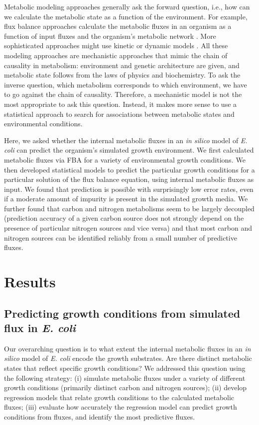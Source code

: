 \documentclass[12pt]{article}
\begin{document}
Metabolic modeling approaches generally ask the forward question, i.e., how can we calculate the metabolic state as a function of the environment. For example, flux balance approaches calculate the metabolic fluxes in an organism as a function of input fluxes and the organism's metabolic network \cite{Segreetal2002,Feistetal2007,SnitkinSegre2008,Orthetal2010}. More sophisticated approaches might use kinetic or dynamic models \cite{Covertetal2008,Adadietal2012}. All these modeling approaches are mechanistic approaches that mimic the chain of causality in metabolism: environment and genetic architecture are given, and metabolic state follows from the laws of physics and biochemistry. To ask the inverse question, which metabolism corresponds to which environment, we have to go against the chain of causality. Therefore, a mechanistic model is not the most appropriate to ask this question. Instead, it makes more sense to use a statistical approach to search for associations between metabolic states and environmental conditions.

Here, we asked whether the internal metabolic fluxes in an \emph{in silico} model of \emph{E. coli} can predict the organism's simulated growth environment. We first calculated metabolic fluxes via FBA for a variety of environmental growth conditions. We then developed statistical models to predict the particular growth conditions for a particular solution of the flux balance equation, using internal metabolic fluxes as input. We found that prediction is possible with surprisingly low error rates, even if a moderate amount of impurity is present in the simulated growth media. We further found that carbon and nitrogen metabolisms seem to be largely decoupled (prediction accuracy of a given carbon source does not strongly depend on the presence of particular nitrogen sources and vice versa) and that most carbon and nitrogen sources can be identified reliably from a small number of predictive fluxes.

\section{Results}

\subsection{Predicting growth conditions from simulated flux in \emph{E. coli}}

Our overarching question is to what extent the internal metabolic fluxes in an \emph{in silico} model of \emph{E. coli} encode the growth substrates. Are there distinct metabolic states that reflect specific growth conditions? We addressed this question using the following strategy: (i) simulate metabolic fluxes under a variety of different growth conditions (primarily distinct carbon and nitrogen sources); (ii) develop regression models that relate growth conditions to the calculated metabolic fluxes; (iii) evaluate how accurately the regression model can predict growth conditions from fluxes, and identify the most predictive fluxes.
\end{document}
